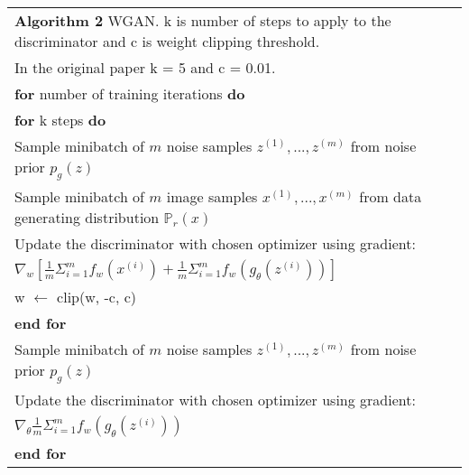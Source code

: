 \documentclass[10pt,twocolumn,letterpaper]{article}
\begin{document}
\begin{table*}[t]
  \centering
  \begin{tabular}{lcr}
   {\bf Algorithm 2} WGAN. k is number of steps to apply to the discriminator and c is weight clipping threshold. \\
   {\color{blue} In the original paper k = 5 and c = 0.01.} \\ \hline
   {\bf for} number of training iterations {\bf do}\\
   \hspace{4mm} {\bf for} k steps {\bf do}\\
   \hspace{8mm} Sample minibatch of $m$ noise samples ${z^{(1)}, ..., z^{(m)}}$ from noise prior $p_g(z)$\\
   \hspace{8mm} Sample minibatch of $m$ image samples ${x^{(1)}, ..., x^{(m)}}$ from data generating distribution $\mathbb{P}_r(x)$\\
   \hspace{8mm} Update the discriminator with chosen optimizer using gradient: \\
   \hspace{16mm} {\color{blue} $\nabla_{w} [\frac{1}{m} \Sigma_{i=1}^m f_w(x^{(i)}) + \frac{1}{m} \Sigma_{i=1}^m  f_w(g_\theta(z^{(i)}))]$} \\
   \hspace{16mm} {\color{blue} w $\xleftarrow{}$ clip(w, -c, c)}\\
   \hspace{4mm} {\bf end for} \\
   \hspace{4mm} Sample minibatch of $m$ noise samples ${z^{(1)}, ..., z^{(m)}}$ from noise prior $p_g(z)$\\
   \hspace{4mm} Update the discriminator with chosen optimizer using gradient: \\
   \hspace{16mm} {\color{blue} $\nabla_{\theta} \frac{1}{m} \Sigma_{i=1}^m f_w(g_\theta(z^{(i)}))$ }\\   
   {\bf end for} \\ \hline
  \end{tabular}
  \label{algo_wgan}
\end{table*}
\end{document}
